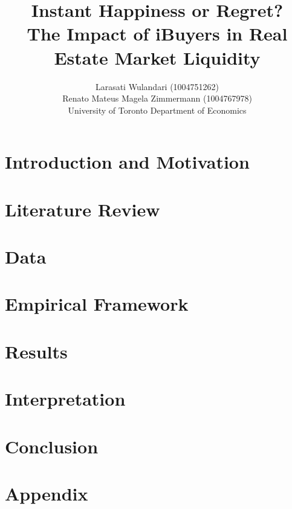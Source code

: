 \documentclass{article}
\title{Instant Happiness or Regret? \\
\Large The Impact of iBuyers in Real Estate Market Liquidity \\
}
\author{
    Larasati Wulandari (1004751262) \\
    Renato Mateus Magela Zimmermann (1004767978)    \\
    University of Toronto Department of Economics
}
\begin{document}
\doublespacing

\maketitle



\twocolumn

\section{Introduction and Motivation}



\section{Literature Review}




%

\section{Data}



\section{Empirical Framework}\label{empirical_framework}



\section{Results}



\section{Interpretation}



\section{Conclusion}



\medskip



\pagebreak
\onecolumn

\section{Appendix}


\end{document}
